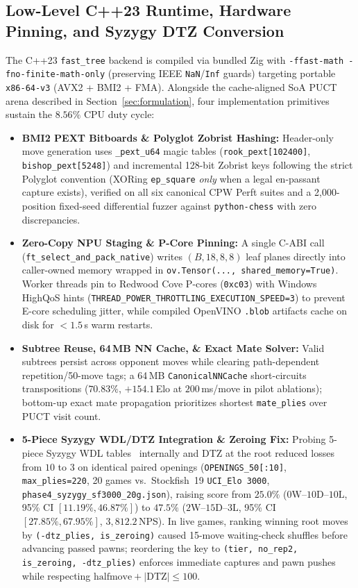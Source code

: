 \documentclass[10pt,twocolumn]{article}
\begin{document}
\subsection{Low-Level C++23 Runtime, Hardware Pinning, and Syzygy DTZ Conversion}
\label{app:engine}
The C++23 \texttt{fast\_tree} backend is compiled via bundled Zig with \texttt{-ffast-math -fno-finite-math-only} (preserving IEEE \texttt{NaN}/\texttt{Inf} guards) targeting portable \texttt{x86-64-v3} (AVX2 + BMI2 + FMA). Alongside the cache-aligned SoA PUCT arena described in Section~\ref{sec:formulation}, four implementation primitives sustain the $8.56\%$ CPU duty cycle:
\begin{itemize}
  \item \textbf{BMI2 PEXT Bitboards \& Polyglot Zobrist Hashing:} Header-only move generation uses \texttt{\_pext\_u64} magic tables (\texttt{rook\_pext[102400]}, \texttt{bishop\_pext[5248]}) and incremental 128-bit Zobrist keys following the strict Polyglot convention (XORing \texttt{ep\_square} \emph{only} when a legal en-passant capture exists), verified on all six canonical CPW Perft suites and a 2,000-position fixed-seed differential fuzzer against \texttt{python-chess} with zero discrepancies.
  \item \textbf{Zero-Copy NPU Staging \& P-Core Pinning:} A single C-ABI call (\texttt{ft\_select\_and\_pack\_native}) writes $(B,18,8,8)$ leaf planes directly into caller-owned memory wrapped in \texttt{ov.Tensor(..., shared\_memory=True)}. Worker threads pin to Redwood Cove P-cores (\texttt{0xc03}) with Windows HighQoS hints (\texttt{THREAD\_POWER\_THROTTLING\_EXECUTION\_SPEED=3}) to prevent E-core scheduling jitter, while compiled OpenVINO \texttt{.blob} artifacts cache on disk for $<1.5$\,s warm restarts.
  \item \textbf{Subtree Reuse, 64\,MB NN Cache, \& Exact Mate Solver:} Valid subtrees persist across opponent moves while clearing path-dependent repetition/50-move tags; a 64\,MB \texttt{CanonicalNNCache} short-circuits transpositions ($70.83\%$, $+154.1$\,Elo at $200$\,ms/move in pilot ablations); bottom-up exact mate propagation prioritizes shortest \texttt{mate\_plies} over PUCT visit count.
  \item \textbf{5-Piece Syzygy WDL/DTZ Integration \& Zeroing Fix:} Probing 5-piece Syzygy WDL tables~\cite{syzygy2013} internally and DTZ at the root reduced losses from $10$ to $3$ on identical paired openings (\texttt{OPENINGS\_50[:10]}, \texttt{max\_plies=220}, 20 games vs.\ Stockfish~19 \texttt{UCI\_Elo 3000}, \texttt{phase4\_syzygy\_sf3000\_20g.json}), raising score from $25.0\%$ ($0\text{W}\text{--}10\text{D}\text{--}10\text{L}$, 95\% CI $[11.19\%, 46.87\%]$) to $47.5\%$ ($2\text{W}\text{--}15\text{D}\text{--}3\text{L}$, 95\% CI $[27.85\%, 67.95\%]$, $3{,}812.2$\,NPS). In live games, ranking winning root moves by \texttt{(-dtz\_plies, is\_zeroing)} caused 15-move waiting-check shuffles before advancing passed pawns; reordering the key to \texttt{(tier, no\_rep2, is\_zeroing, -dtz\_plies)} enforces immediate captures and pawn pushes while respecting $\text{halfmove} + |\mathrm{DTZ}| \le 100$.
\end{itemize}
\end{document}
